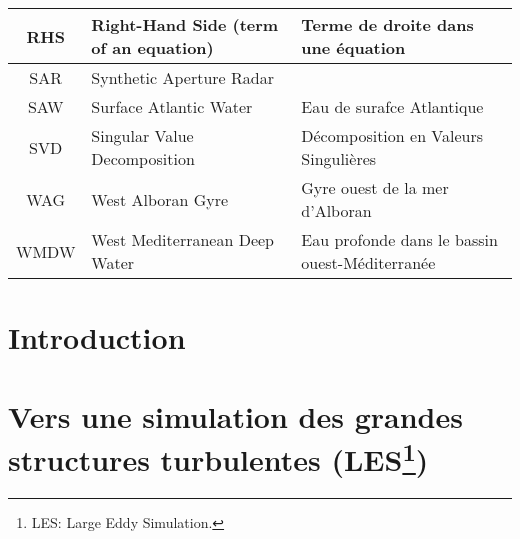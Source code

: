 \documentclass[a4paper,12pt,notitlepage,twoside]{report}
\numberwithin{equation}{section}
\begin{document}
\begin{table}[!h]
\begin{tabular}{|c|ll|}
                \hline
                RHS & Right-Hand Side (term of an equation) & Terme de droite dans une équation \\
                \hline
                SAR & Synthetic Aperture Radar & \\
                \hline
                SAW & Surface Atlantic Water & Eau de surafce Atlantique\\
                \hline
                SVD & Singular Value Decomposition & Décomposition en Valeurs Singulières  \\
                \hline
                WAG & West Alboran Gyre & Gyre ouest de la mer d'Alboran\\
                \hline
                WMDW & West Mediterranean Deep Water & Eau profonde dans le bassin ouest-Méditerranée\\
                \hline
        \end{tabular}
\end{table}


\newpage
\chapter{Introduction}
\label{chapINTRO}




\chapter[Vers une simulation des grandes structures turbulentes]{Vers une simulation des grandes structures turbulentes (LES\footnote{LES: Large Eddy Simulation.\label{LES}})}
\label{chap2}
\end{document}
